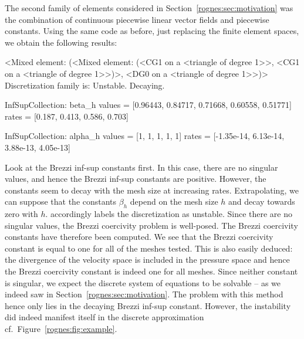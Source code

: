 The second family of elements considered in
Section~\ref{rognes:sec:motivation} was the combination of continuous
piecewise linear vector fields and piecewise constants. Using the same
code as before, just replacing the finite element spaces, we obtain
the following results:
\begin{python}
<Mixed element: (<Mixed element: (<CG1 on a <triangle of degree 1>>,
<CG1 on a <triangle of degree 1>>)>, <DG0 on a <triangle of degree 1>>)>
Discretization family is: Unstable. Decaying.

InfSupCollection: beta_h
values =         [0.96443, 0.84717, 0.71668, 0.60558, 0.51771]
rates  =         [0.187, 0.413, 0.586, 0.703]

InfSupCollection: alpha_h
values =         [1, 1, 1, 1, 1]
rates  =         [-1.35e-14, 6.13e-14, 3.88e-13, 4.05e-13]
\end{python}
Look at the Brezzi inf-sup constants first. In this case, there are no
singular values, and hence the Brezzi inf-sup constants are
positive. However, the constants seem to decay with the mesh size at
increasing rates. Extrapolating, we can suppose that the constants
$\beta_h$ depend on the mesh size $h$ and decay towards zero with
$h$. \rognesascot{} accordingly labels the discretization as
unstable. Since there are no singular values, the Brezzi coercivity
problem is well-posed. The Brezzi coercivity constants have therefore
been computed. We see that the Brezzi coercivity constant is equal to
one for all of the meshes tested. This is also easily deduced: the
divergence of the velocity space is included in the pressure space and
hence the Brezzi coercivity constant is indeed one for all
meshes. Since neither constant is singular, we expect the discrete
system of equations to be solvable -- as we indeed saw in
Section~\ref{rognes:sec:motivation}. The problem with this method
hence only lies in the decaying Brezzi inf-sup constant. However, the
instability did indeed manifest itself in the discrete approximation
cf.~Figure~\ref{rognes:fig:example}.

